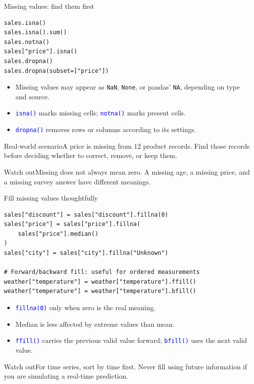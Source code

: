 \documentclass[aspectratio=169,10pt]{beamer}
\newcommand{\scenario}[1]{\begin{block}{Real-world scenario}#1\end{block}}
\newcommand{\pitfall}[1]{\begin{alertblock}{Watch out}#1\end{alertblock}}
\newcommand{\method}[1]{\texttt{\textcolor{Blue}{#1}}}
\begin{document}
\begin{frame}[fragile]{Missing values: find them first}
\begin{lstlisting}
sales.isna()
sales.isna().sum()
sales.notna()
sales["price"].isna()
sales.dropna()
sales.dropna(subset=["price"])
\end{lstlisting}
\begin{itemize}
\item Missing values may appear as \texttt{NaN}, \texttt{None}, or pandas' \texttt{NA}, depending on type and source.
\item \method{isna()} marks missing cells; \method{notna()} marks present cells.
\item \method{dropna()} removes rows or columns according to its settings.
\end{itemize}
\scenario{A price is missing from 12 product records. Find those records before deciding whether to correct, remove, or keep them.}
\pitfall{Missing does not always mean zero. A missing age, a missing price, and a missing survey answer have different meanings.}
\end{frame}

\begin{frame}[fragile]{Fill missing values thoughtfully}
\begin{lstlisting}
sales["discount"] = sales["discount"].fillna(0)
sales["price"] = sales["price"].fillna(
    sales["price"].median()
)
sales["city"] = sales["city"].fillna("Unknown")

# Forward/backward fill: useful for ordered measurements
weather["temperature"] = weather["temperature"].ffill()
weather["temperature"] = weather["temperature"].bfill()
\end{lstlisting}
\begin{itemize}
\item \method{fillna(0)} only when zero is the real meaning.
\item Median is less affected by extreme values than mean.
\item \method{ffill()} carries the previous valid value forward; \method{bfill()} uses the next valid value.
\end{itemize}
\pitfall{For time series, sort by time first. Never fill using future information if you are simulating a real-time prediction.}
\end{frame}
\end{document}
